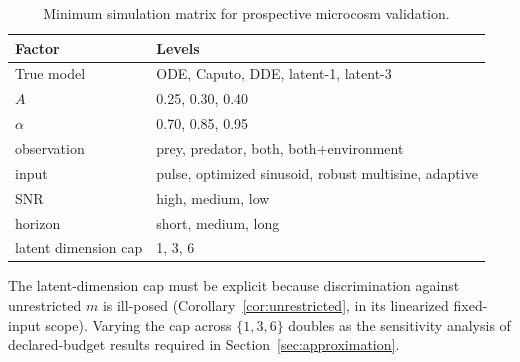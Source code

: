 \begin{table}[ht]
  \centering
  \small
  \begin{tabular}{ll}
    \hline
    Factor & Levels \\
    \hline
    True model & ODE, Caputo, DDE, latent-1, latent-3 \\
    $A$ & 0.25, 0.30, 0.40 \\
    $\alpha$ & 0.70, 0.85, 0.95 \\
    observation & prey, predator, both, both+environment \\
    input & pulse, optimized sinusoid, robust multisine, adaptive \\
    SNR & high, medium, low \\
    horizon & short, medium, long \\
    latent dimension cap & 1, 3, 6 \\
    \hline
  \end{tabular}
  \caption{Minimum simulation matrix for prospective microcosm validation.}
  \label{tab:sim_matrix}
\end{table}

The latent-dimension cap must be explicit because discrimination against unrestricted \(m\) is ill-posed (Corollary~\ref{cor:unrestricted}, in its linearized fixed-input scope). Varying the cap across $\{1,3,6\}$ doubles as the sensitivity analysis of declared-budget results required in Section~\ref{sec:approximation}.

